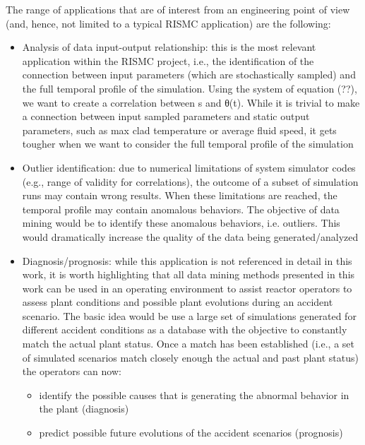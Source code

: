 The range of applications that are of interest from an engineering point of view (and, hence, not 
limited to a typical RISMC application) are the following:
\begin{itemize}
  \item Analysis of data input-output relationship: this is the most relevant application within the RISMC 
        project, i.e., the identification of the connection between input parameters (which are stochastically 
        sampled) and the full temporal profile of the simulation. Using the system of equation (??), we want 
        to create a correlation between s and θ(t). While it is trivial to make a connection
        between input sampled parameters and static output parameters, such as max clad temperature or 
        average fluid speed, it gets tougher when we want to consider the full temporal profile of the 
        simulation
  \item Outlier identification: due to numerical limitations of system simulator codes (e.g., range of 
        validity for correlations), the outcome of a subset of simulation runs may contain wrong results. 
        When these limitations are reached, the temporal profile may contain anomalous behaviors. The
        objective of data mining would be to identify these anomalous behaviors, i.e. outliers. This would 
        dramatically increase the quality of the data being generated/analyzed
  \item Diagnosis/prognosis: while this application is not referenced in detail in this work, it is worth 
        highlighting that all data mining methods presented in this work can be used in an operating environment 
        to assist reactor operators to assess plant conditions and possible plant evolutions
        during an accident scenario. The basic idea would be use a large set of simulations generated for different 
        accident conditions as a database with the objective to constantly match the actual plant status. 
        Once a match has been established (i.e., a set of simulated scenarios match closely enough the actual and 
        past plant status) the operators can now:
        \begin{itemize}
          \item identify the possible causes that is generating the abnormal behavior in the plant (diagnosis)
          \item predict possible future evolutions of the accident scenarios (prognosis)
        \end{itemize} 
\end{itemize} 


